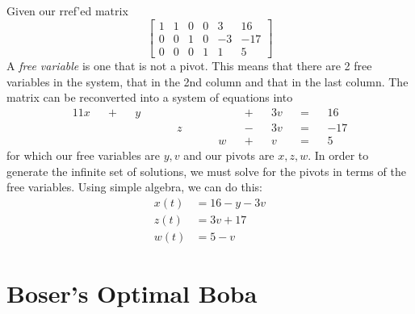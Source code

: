 \documentclass[]{article}
\begin{document}
\subsection{}

Given our rref'ed matrix
\begin{equation}
	\left[
	\begin{array}{ccccc|c}
	1 & 1 & 0 & 0 & 3 & 16 \\
	0 & 0 & 1 & 0 & -3 & -17 \\
	0 & 0 & 0 & 1 & 1 & 5
	\end{array}
	\right]
\end{equation}
A \emph{free variable} is one that is not a pivot. This means that there are 2 free variables in the system, that in the 2nd column and that in the last column. The matrix can be reconverted into a system of equations into 
\begin{alignat}{11}
	x && + && y && && && && && + && 3v && = && 16 \\
	&& && && && z && && && - && 3v && = && -17 \\ 
	&& && && && && && w && + && v && = && 5
\end{alignat}
for which our free variables are \(y, v\) and our pivots are \(x, z, w\). In order to generate the infinite set of solutions, we must solve for the pivots in terms of the free variables. Using simple algebra, we can do this:
\begin{align}
	x(t) &= 16 - y - 3v \\
	z(t) &= 3v + 17 \\
	w(t) &= 5 - v
\end{align}

\section{Boser's Optimal Boba}

\subsection{}
\end{document}
